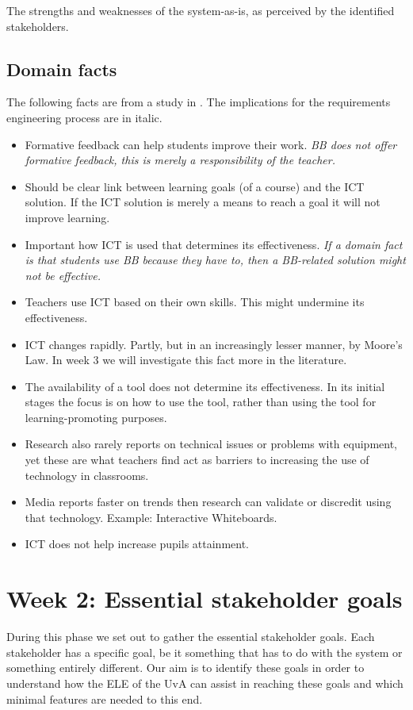 The strengths and weaknesses of the system-as-is, as perceived by the identified stakeholders.

\section{Domain facts}
The following facts are from a study in \cite{ict_study}. The implications for the requirements engineering process are in italic.
\begin{itemize}
	\item Formative feedback can help students improve their work. \textit{BB does not offer formative feedback, this is merely a responsibility of the teacher.}
	\item Should be clear link between learning goals (of a course) and the ICT solution. If the ICT solution is merely a means to reach a goal it will not improve learning. 
	\item Important how ICT is used that determines its effectiveness. \textit{If a domain fact is that students use BB because they have to, then a BB-related solution might not be effective.}
	\item Teachers use ICT based on their own skills. This might undermine its effectiveness.
	\item ICT changes rapidly. Partly, but in an increasingly lesser manner, by Moore's Law. In week 3 we will investigate this fact more in the literature.
	\item The availability of a tool does not determine its effectiveness. In its initial stages the focus is on how to use the tool, rather than using the tool for learning-promoting purposes.
	\item Research also rarely reports on technical issues or problems with equipment, yet these are what teachers find act as barriers to increasing the use of technology in classrooms.
	\item Media reports faster on trends then research can validate or discredit using that technology. Example: Interactive Whiteboards. 
	\item ICT does not help increase pupils attainment.
\end{itemize}


\chapter{Week 2: Essential stakeholder goals}
During this phase we set out to gather the essential stakeholder goals. Each stakeholder has a specific goal, be it something that has to do with the system or something entirely different. Our aim is to identify these goals in order to understand how the ELE of the UvA can assist in reaching these goals and which minimal features are needed to this end.


